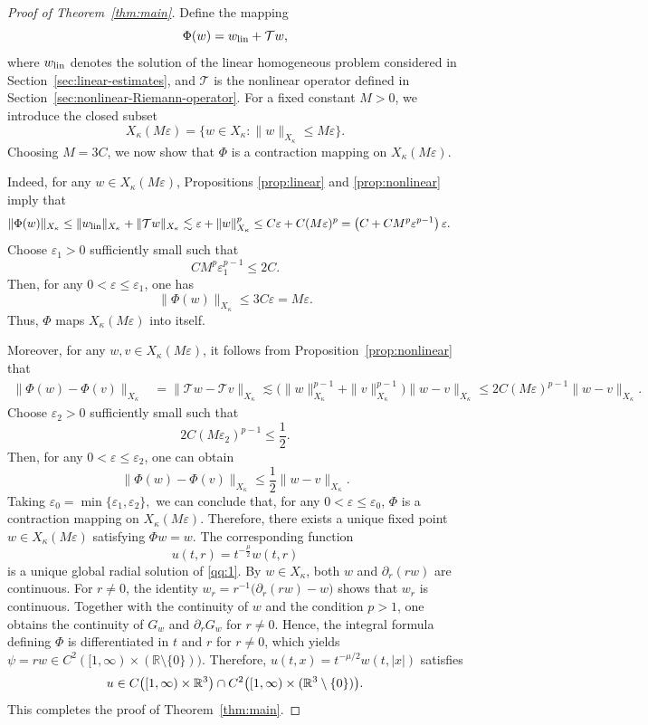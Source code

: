 \documentclass[11pt,twoside]{article}
\newcommand{\R}{\mathbb R}
\newcommand{\p}{\partial}
\newcommand{\Tcal}{\mathcal T}
\theoremstyle{plain}
\theoremstyle{definition}
\theoremstyle{remark}
\numberwithin{equation}{section}
\begin{document}
\begin{proof}
[Proof of Theorem~\ref{thm:main}]
Define the mapping
\[
\Phi (w)=w_{\rm lin}+\Tcal w,
\]
where $w_{\rm lin}$ denotes the solution of the linear homogeneous
problem considered in Section~\ref{sec:linear-estimates}, and $\Tcal$ is the nonlinear
operator defined in Section~\ref{sec:nonlinear-Riemann-operator}.
For a fixed constant $M>0$, we introduce the closed subset
\[
X_\kappa(M\varepsilon)
=
\{w\in X_\kappa:\|w\|_{X_\kappa}\leq M\varepsilon\}.
\]
Choosing
$M=3C$, we now show that $\Phi$ is a contraction mapping on
$X_\kappa(M\varepsilon)$.

Indeed, for any $w\in X_\kappa(M\varepsilon)$, Propositions
\ref{prop:linear} and \ref{prop:nonlinear} imply that
\[
\begin{aligned}
\|\Phi(w)\|_{X_\kappa}
&\leq
\|w_{\rm lin}\|_{X_\kappa}
+
\|\Tcal w\|_{X_\kappa}
\lesssim
\varepsilon+\|w\|_{X_\kappa}^{p}
\leq
C\varepsilon+C(M\varepsilon)^p
=
\left(
C+CM^p\varepsilon^{p-1}
\right)\varepsilon.
\end{aligned}
\]
Choose $\varepsilon_1>0$ sufficiently small such that
\[
CM^p\varepsilon_1^{p-1}\leq2C .
\]
Then, for any $0<\varepsilon\leq\varepsilon_1$, one has
\[
\|\Phi(w)\|_{X_\kappa}
\leq
3C\varepsilon
=
M\varepsilon .
\]
Thus, $\Phi$ maps $X_\kappa(M\varepsilon)$ into itself.

Moreover, for any $w,v\in X_\kappa(M\varepsilon)$, it follows from
Proposition~\ref{prop:nonlinear} that
\[
\begin{aligned}
\|\Phi(w)-\Phi(v)\|_{X_\kappa}
&=
\|\Tcal w-\Tcal v\|_{X_\kappa}
\lesssim
\big(\|w\|_{X_\kappa}^{p-1}
+\|v\|_{X_\kappa}^{p-1}
\big)
\|w-v\|_{X_\kappa}
\leq
2C(M\varepsilon)^{p-1}
\|w-v\|_{X_\kappa}.
\end{aligned}
\]
Choose $\varepsilon_2>0$ sufficiently small such that
\[
2C(M\varepsilon_2)^{p-1}\leq\frac12 .
\]
Then, for any $0<\varepsilon\leq\varepsilon_2$, one can obtain
\[
\|\Phi(w)-\Phi(v)\|_{X_\kappa}
\leq
\frac12
\|w-v\|_{X_\kappa}.
\]
Taking
$
\varepsilon_0=\min\{\varepsilon_1,\varepsilon_2\},
$
we can conclude that, for any
$0<\varepsilon\leq\varepsilon_0$, $\Phi$ is a contraction mapping on
$X_\kappa(M\varepsilon)$.
Therefore, there exists a unique fixed point
$w\in X_\kappa(M\varepsilon)$ satisfying
$
\Phi w=w.
$
The corresponding function
\[
u(t,r)=t^{-\frac{\mu}{2}}w(t,r)
\]
is a unique global radial solution of \eqref{qq:1}.
By $w\in X_\kappa$, both $w$ and $\p_r(rw)$ are continuous. For
$r\neq0$, the identity
$w_r=r^{-1}\bigl(\p_r(rw)-w\bigr)$
shows that $w_r$ is continuous. Together with the continuity of $w$
and the condition $p>1$, one obtains the continuity of $G_w$ and
$\p_rG_w$ for $r\neq0$.
Hence, the integral formula defining $\Phi$ is differentiated in
$t$ and $r$ for $r\neq0$, which yields
$\psi=rw\in C^2([1,\infty)\times(\R\setminus\{0\}))$.
Therefore,
$u(t,x)=t^{-\mu/2}w(t,|x|)$ satisfies
\[
u\in C\bigl([1,\infty)\times\Bbb R^3\bigr)
\cap C^2\bigl([1,\infty)\times(\Bbb R^3\setminus\{0\})\bigr).
\]
This completes the proof of Theorem~\ref{thm:main}.
\end{proof}
\end{document}
